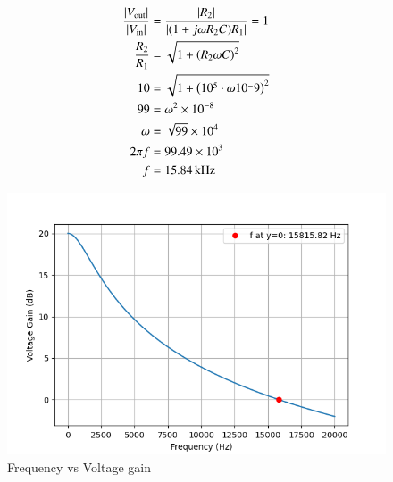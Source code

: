 \documentclass[journal,12pt,twocolumn]{IEEEtran}
\theoremstyle{remark}
\begin{document}
\begin{align}
\frac{|V_{\text{out}}|}{|V_{\text{in}}|} &= \frac{|R_2|}{|(1+ j\omega R_2C)R_1|} = 1 \\
\frac{R_2}{R_1} &= \sqrt{1 + \left(R_2 \omega C\right)^2} \\
10 &= \sqrt{1 + \left(10^5 \cdot \omega 10^-9\right)^2} \\
99 &= \omega^2 \times 10^{-8} \\
\omega &= \sqrt{99} \times 10^4 \\
2\pi f &= 99.49 \times 10^3 \\
f &= 15.84 \, \text{kHz}
\end{align}
\begin{figure}[h!]
\centering
\includegraphics[width=\columnwidth]{figs/plot.png}
\caption{Frequency vs Voltage gain}
\end{figure}
\end{document}
